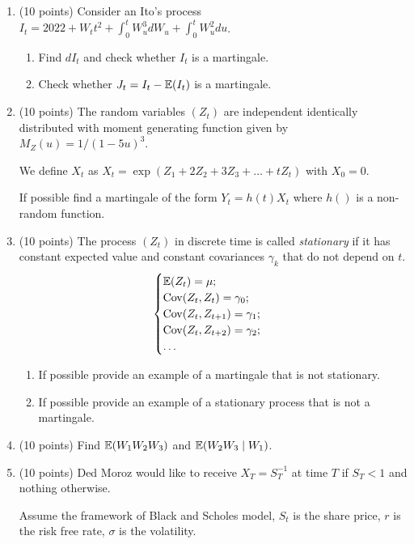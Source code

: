 \begin{enumerate}

  \item (10 points) Consider an Ito's process $I_t = 2022 + W_t t^2 + \int_0^t W_u^3 dW_u + \int_0^t W_u^2 du$.
    \begin{enumerate}
      \item Find $dI_t$ and check whether $I_t$ is a martingale. 
      \item Check whether $J_t = I_t - \operatorname{\mathbb{E}}(I_t)$ is a martingale.
    \end{enumerate}
    
  \item (10 points) The random variables $(Z_t)$ are independent identically distributed 
  with moment generating function given by $M_{Z}(u) = 1/(1 - 5u)^3$. 
  
  We define $X_t$ as $X_t = \exp(Z_1 + 2Z_2 + 3Z_3 + \ldots + tZ_t)$ with $X_0 = 0$. 
  
  If possible find a martingale of the form $Y_t = h(t) X_t$ where $h()$ is a non-random function.
  
  \item (10 points) The process $(Z_t)$ in discrete time is called \textit{stationary} if it has constant expected value 
  and constant covariances $\gamma_k$ that do not depend on $t$. 
  \[
  \begin{cases}
  \operatorname{\mathbb{E}}(Z_t) = \mu; \\
  \operatorname{Cov}(Z_t, Z_t) = \gamma_0; \\
  \operatorname{Cov}(Z_t, Z_{t+1}) = \gamma_1; \\
  \operatorname{Cov}(Z_t, Z_{t+2}) = \gamma_2; \\
  \ldots \\
  \end{cases}
  \]
  
  \begin{enumerate}
    \item If possible provide an example of a martingale that is not stationary.
    \item If possible provide an example of a stationary process that is not a martingale.
  \end{enumerate}
  
  \item (10 points) Find $\operatorname{\mathbb{E}}(W_1 W_2 W_3)$ and $\operatorname{\mathbb{E}}(W_2 W_3 \mid W_1)$.
  \item (10 points) Ded Moroz would like to receive $X_T = S^{-1}_T$ at time $T$ if $S_T < 1$ and nothing otherwise.
      
  Assume the framework of Black and Scholes model, $S_t$ is the share price, $r$ is the risk free rate,
  $\sigma$ is the volatility. 
  

\end{enumerate}
